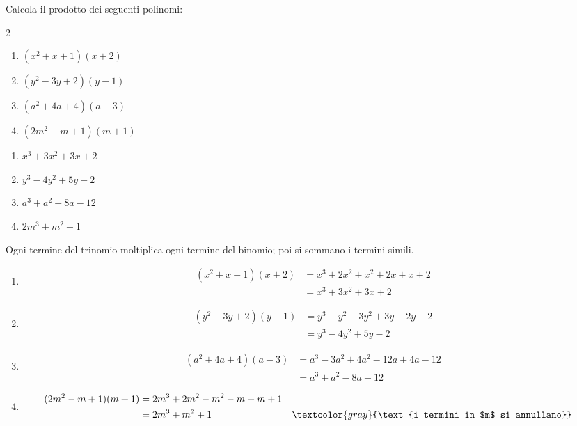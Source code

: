 \begin{question}[ID=1.4, subtitle={Prodotti di polinomi di grado superiore}, tags={prodotti, polinomi}, difficulty=media]
Calcola il prodotto dei seguenti polinomi:
\begin{center}\begin{minipage}{0.92\linewidth}
\begin{multicols}{2}
\begin{enumerate}[leftmargin=3.2cm]
\item $(x^2 + x + 1)(x+2)$
\item $(y^2 - 3y + 2)(y-1)$
\item $(a^2 + 4a + 4)(a-3)$
\item $(2m^2 - m + 1)(m+1)$
\end{enumerate}
\end{multicols}
\end{minipage}\end{center}
\begin{solution}
\begin{enumerate}
    \item $x^3+3x^2+3x+2$
    \item $y^3-4y^2+5y-2$
    \item $a^3+a^2-8a-12$
    \item $2m^3+m^2+1$
\end{enumerate}
\end{solution}
\begin{explanation}
Ogni termine del trinomio moltiplica ogni termine del binomio; poi si sommano i termini simili.
\begin{enumerate}
    \item \[\begin{aligned}
    (x^2+x+1)(x+2) &= x^3+2x^2+x^2+2x+x+2\\
    &= x^3+3x^2+3x+2
    \end{aligned}\]
    \item \[\begin{aligned}
    (y^2-3y+2)(y-1) &= y^3-y^2-3y^2+3y+2y-2\\
    &= y^3-4y^2+5y-2
    \end{aligned}\]
    \item \[\begin{aligned}
    (a^2+4a+4)(a-3) &= a^3-3a^2+4a^2-12a+4a-12\\
    &= a^3+a^2-8a-12
    \end{aligned}\]
    \item \[\begin{aligned}
    (2m^2-m+1)(m+1) &= 2m^3+2m^2-m^2-m+m+1\\
    &= 2m^3+m^2+1 && \textcolor{gray}{\text{i termini in $m$ si annullano}}
    \end{aligned}\]
\end{enumerate}
\end{explanation}
\end{question}

